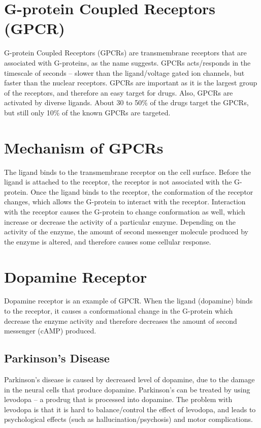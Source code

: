 \section{G-protein Coupled Receptors (GPCR)}

G-protein Coupled Receptors (GPCRs) are transmembrane receptors that are associated with G-proteins, as the name suggests.
GPCRs acts/responds in the timescale of seconds -- slower than the ligand/voltage gated ion channels, but faster than the nuclear receptors.
GPCRs are important as it is the largest group of the receptors, and therefore an easy target for drugs.
Also, GPCRs are activated by diverse ligands.
About 30 to 50\% of the drugs target the GPCRs, but still only 10\% of the known GPCRs are targeted.

\section{Mechanism of GPCRs}

The ligand binds to the transmembrane receptor on the cell surface.
Before the ligand is attached to the receptor, the receptor is not associated with the G-protein.
Once the ligand binds to the receptor, the conformation of the receptor changes, which allows the G-protein to interact with the receptor.
Interaction with the receptor causes the G-protein to change conformation as well, which increase or decrease the activity of a particular enzyme.
Depending on the activity of the enzyme, the amount of second messenger molecule produced by the enzyme is altered, and therefore causes some cellular response.

\section{Dopamine Receptor}

Dopamine receptor is an example of GPCR.
When the ligand (dopamine) binds to the receptor, it causes a conformational change in the G-protein which decrease the enzyme activity and therefore decreases the amount of second messenger (cAMP) produced.

\subsection{Parkinson's Disease}

Parkinson's disease is caused by decreased level of dopamine, due to the damage in the neural cells that produce dopamine.
Parkinson's can be treated by using levodopa -- a prodrug that is processed into dopamine.
The problem with levodopa is that it is hard to balance/control the effect of levodopa, and leads to psychological effects (such as hallucination/psychosis) and motor complications.

